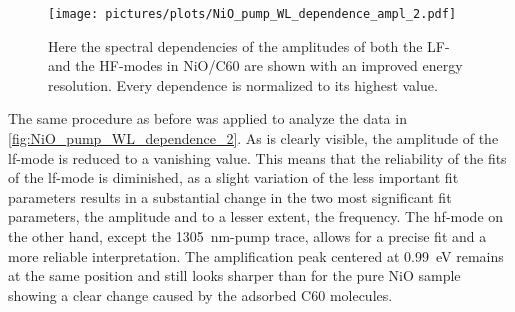 \begin{figure}[ht]
    \centering
    \texttt{[image: pictures/plots/NiO\_pump\_WL\_dependence\_ampl\_2.pdf]}
    \caption{Here the spectral dependencies of the amplitudes of both the LF- and the HF-modes in NiO/C60 are shown with an improved energy resolution. Every dependence is normalized to its highest value.}
    \label{fig:NiO_pump_WL_dependence_ampl_2}
\end{figure}
\FloatBarrier
The same procedure as before was applied to analyze the data in \autoref{fig:NiO_pump_WL_dependence_2}.
As is clearly visible, the amplitude of the lf-mode is reduced to a vanishing value.
This means that the reliability of the fits of the lf-mode is diminished, as a slight variation of the less important fit parameters results in a substantial change in the two most significant fit parameters, the amplitude and to a lesser extent, the frequency.
The hf-mode on the other hand, except the \qty{1305}{nm}-pump trace, allows for a precise fit and a more reliable interpretation.
The amplification peak centered at \qty{0.99}{eV} remains at the same position and still looks sharper than for the pure NiO sample showing a clear change caused by the adsorbed C60 molecules.

